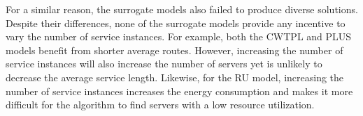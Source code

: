 For a similar reason, the surrogate models also failed to produce diverse solutions. Despite their differences, none of the surrogate models provide any incentive to vary the number of service instances. For example, both the CWTPL and PLUS models benefit from shorter average routes. However, increasing the number of service instances will also increase the number of servers yet is unlikely to decrease the average service length. Likewise, for the RU model, increasing the number of service instances increases the energy consumption and makes it more difficult for the algorithm to find servers with a low resource utilization.






